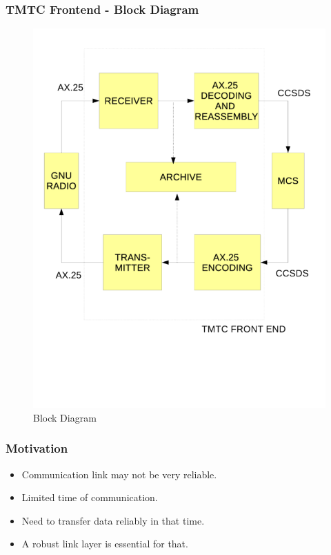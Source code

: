 \documentclass{beamer}
\begin{document}
\begin{frame}
\frametitle{TMTC Frontend - Block Diagram}
\begin{figure}
\includegraphics[scale = 0.3 ]{tmtc.pdf}
\caption{Block Diagram}
\label{fig1:tmtc}
\end{figure}
\end{frame}

\begin{frame}
\frametitle{Motivation}
\begin{itemize}
\item Communication link may not be very reliable.
\item Limited time of communication.
\item Need to transfer data reliably in that time.
\item A robust link layer is essential for that.
\end{itemize}
\end{frame}
\end{document}
